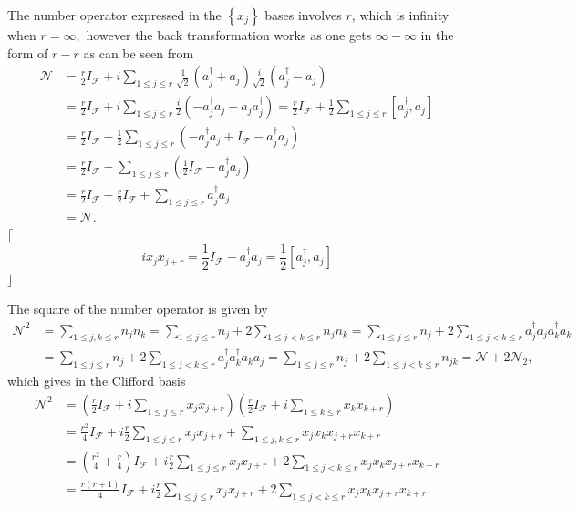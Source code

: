 \documentclass[aps,preprint]{revtex4}%
\begin{document}
The number operator expressed in the $\left\{  x_{j}\right\}  $ bases involves
$r$, which is infinity when $r=\infty,$ however the back transformation works
as one gets $\infty-\infty$ in the form of $r-r$ as can be seen from%
\begin{align}
\mathcal{N}  &  =\frac{r}{2}I_{\mathcal{F}}+i\sum_{1\leq j\leq r}\frac
{1}{\sqrt{2}}\left(  a_{j}^{\dagger}+a_{j}\right)  \frac{i}{\sqrt{2}}\left(
a_{j}^{\dagger}-a_{j}\right) \nonumber\\
&  =\frac{r}{2}I_{\mathcal{F}}+i\sum_{1\leq j\leq r}\frac{i}{2}\left(
-a_{j}^{\dagger}a_{j}+a_{j}a_{j}^{\dagger}\right)  =\frac{r}{2}I_{\mathcal{F}%
}+\frac{1}{2}\sum_{1\leq j\leq r}\left[  a_{j}^{\dagger},a_{j}\right]
\nonumber\\
&  =\frac{r}{2}I_{\mathcal{F}}-\frac{1}{2}\sum_{1\leq j\leq r}\left(
-a_{j}^{\dagger}a_{j}+I_{\mathcal{F}}-a_{j}^{\dagger}a_{j}\right) \nonumber\\
&  =\frac{r}{2}I_{\mathcal{F}}-\sum_{1\leq j\leq r}\left(  \frac{1}%
{2}I_{\mathcal{F}}-a_{j}^{\dagger}a_{j}\right) \nonumber\\
&  =\frac{r}{2}I_{\mathcal{F}}-\frac{r}{2}I_{\mathcal{F}}+\sum_{1\leq j\leq
r}a_{j}^{\dagger}a_{j}\nonumber\\
&  =\mathcal{N}.
\end{align}
$\lceil$%
\begin{equation}
ix_{j}x_{j+r}=\frac{1}{2}I_{\mathcal{F}}-a_{j}^{\dagger}a_{j}=\frac{1}%
{2}\left[  a_{j}^{\dagger},a_{j}\right]
\end{equation}
$\rfloor$

The square of the number operator is given by
\begin{align}
\mathcal{N}^{2}  &  =\sum_{1\leq j,k\leq r}n_{j}n_{k}=\sum_{1\leq j\leq
r}n_{j}+2\sum_{1\leq j<k\leq r}n_{j}n_{k}=\sum_{1\leq j\leq r}n_{j}%
+2\sum_{1\leq j<k\leq r}a_{j}^{\dagger}a_{j}a_{k}^{\dagger}a_{k}\\
&  =\sum_{1\leq j\leq r}n_{j}+2\sum_{1\leq j<k\leq r}a_{j}^{\dagger}%
a_{k}^{\dagger}a_{k}a_{j}=\sum_{1\leq j\leq r}n_{j}+2\sum_{1\leq j<k\leq
r}n_{jk}=\mathcal{N}+2\mathcal{N}_{2},
\end{align}
which gives in the Clifford basis
\begin{align}
\mathcal{N}^{2}  &  =\left(  \frac{r}{2}I_{\mathcal{F}}+i\sum_{1\leq j\leq
r}x_{j}x_{j+r}\right)  \left(  \frac{r}{2}I_{\mathcal{F}}+i\sum_{1\leq k\leq
r}x_{k}x_{k+r}\right) \nonumber\\
&  =\frac{r^{2}}{4}I_{\mathcal{F}}+i\frac{r}{2}\sum_{1\leq j\leq r}%
x_{j}x_{j+r}+\sum_{1\leq j,k\leq r}x_{j}x_{k}x_{j+r}x_{k+r}\nonumber\\
&  =\left(  \frac{r^{2}}{4}+\frac{r}{4}\right)  I_{\mathcal{F}}+i\frac{r}%
{2}\sum_{1\leq j\leq r}x_{j}x_{j+r}+2\sum_{1\leq j<k\leq r}x_{j}x_{k}%
x_{j+r}x_{k+r}\nonumber\\
&  =\frac{r\left(  r+1\right)  }{4}I_{\mathcal{F}}+i\frac{r}{2}\sum_{1\leq
j\leq r}x_{j}x_{j+r}+2\sum_{1\leq j<k\leq r}x_{j}x_{k}x_{j+r}x_{k+r}.
\end{align}
\end{document}
